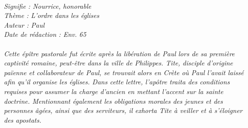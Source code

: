 \BFont
\noindent\hrulefill
{\footnotesize
\textit{
\bigskip
{\centering{}
\\Signifie : Nourrice, honorable
\\Thème : L'ordre dans les églises
\\Auteur : Paul
\\Date de rédaction : Env. 65\\}
}
\textit{
\\Cette épître pastorale fut écrite après la libération de Paul lors de sa première captivité romaine, peut-être dans la ville de Philippes. Tite, disciple d’origine païenne et collaborateur de Paul, se trouvait alors en Crète où Paul l’avait laissé afin qu’il organise les églises. Dans cette lettre, l’apôtre traita des conditions requises pour assumer la charge d’ancien en mettant l’accent sur la sainte doctrine. Mentionnant également les obligations morales des jeunes et des personnes âgées, ainsi que des serviteurs, il exhorta Tite à veiller et à s’éloigner des apostats.\bigskip
}
}
\par\nobreak\noindent\hrulefill
